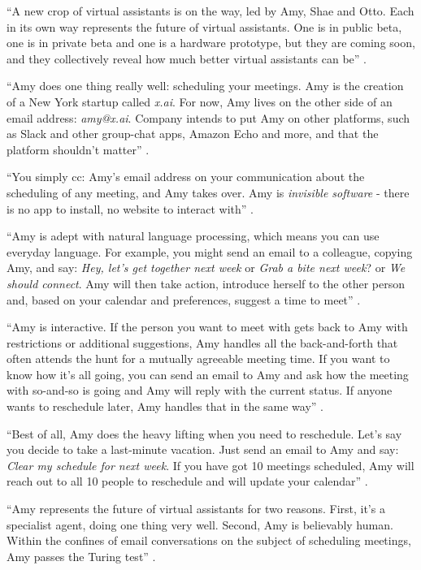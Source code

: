 ``A new crop of virtual assistants is on the way, led by Amy, Shae and Otto. Each in its own way represents the future of virtual assistants. One is in public beta, one is in private beta and one is a hardware prototype, but they are coming soon, and they collectively reveal how much better virtual assistants can be'' \cite{Elgan2016future}.

``Amy does one thing really well: scheduling your meetings. Amy is the creation of a New York startup called {\em x.ai}. For now, Amy lives on the other side of an email address: {\em amy@x.ai}. Company intends to put Amy on other platforms, such as Slack and other group-chat apps, Amazon Echo and more, and that the platform shouldn't matter'' \cite{Elgan2016future}.

``You simply cc: Amy's email address on your communication about the scheduling of any meeting, and Amy takes over. Amy is {\em invisible software} - there is no app to install, no website to interact with'' \cite{Elgan2016future}.

``Amy is adept with natural language processing, which means you can use everyday language. For example, you might send an email to a colleague, copying Amy, and say: {\em Hey, let's get together next week} or {\em Grab a bite next week}? or {\em We should connect}. Amy will then take action, introduce herself to the other person and, based on your calendar and preferences, suggest a time to meet'' \cite{Elgan2016future}.

``Amy is interactive. If the person you want to meet with gets back to Amy with restrictions or additional suggestions, Amy handles all the back-and-forth that often attends the hunt for a mutually agreeable meeting time. If you want to know how it's all going, you can send an email to Amy and ask how the meeting with so-and-so is going and Amy will reply with the current status. If anyone wants to reschedule later, Amy handles that in the same way'' \cite{Elgan2016future}.

``Best of all, Amy does the heavy lifting when you need to reschedule. Let's say you decide to take a last-minute vacation. Just send an email to Amy and say: {\em Clear my schedule for next week}. If you have got 10 meetings scheduled, Amy will reach out to all 10 people to reschedule and will update your calendar'' \cite{Elgan2016future}.

``Amy represents the future of virtual assistants for two reasons. First, it's a specialist agent, doing one thing very well. Second, Amy is believably human. Within the confines of email conversations on the subject of scheduling meetings, Amy passes the Turing test'' \cite{Elgan2016future}.

